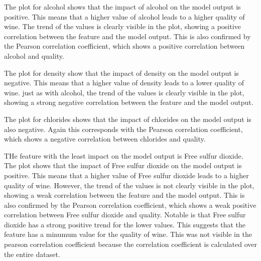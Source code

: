 \documentclass{article}
\begin{document}
The plot for alcohol shows that the impact of alcohol on the model output is positive.
This means that a higher value of alcohol leads to a higher quality of wine.
The trend of the values is clearly visible in the plot, showing a positive correlation between the feature and the model output.
This is also confirmed by the Pearson correlation coefficient, which shows a positive correlation between alcohol and quality.

The plot for density show that the impact of density on the model output is negative.
This means that a higher value of density leads to a lower quality of wine.
just as with alcohol, the trend of the values is clearly visible in the plot, showing a strong negative correlation between the feature and the model output.

The plot for chlorides shows that the impact of chlorides on the model output is also negative. Again this corresponds with the Pearson correlation coefficient, which shows a negative correlation between chlorides and quality.

THe feature with the least impact on the model output is Free sulfur dioxide.
The plot shows that the impact of Free sulfur dioxide on the model output is positive.
This means that a higher value of Free sulfur dioxide leads to a higher quality of wine.
However, the trend of the values is not clearly visible in the plot, showing a weak correlation between the feature and the model output.
This is also confirmed by the Pearson correlation coefficient, which shows a weak positive correlation between Free sulfur dioxide and quality.
Notable is that Free sulfur dioxide has a strong positive trend for the lower values. This suggests that the feature has a minumum value for the quality of wine.
This was not visible in the pearson correlation coefficient because the correlation coefficient is calculated over the entire dataset.
\end{document}
